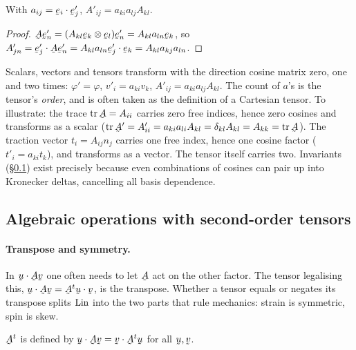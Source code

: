 \begin{theorem}\label{thm:tenstrans}
With $a_{ij}=\ip{\be_{i}}{\be'_{j}}$, $A'_{ij}=a_{ki}a_{lj}A_{kl}$.
\end{theorem}

\begin{proof}
$\bA\be'_{n}=(A_{kl}\be_{k}\otimes\be_{l})\be'_{n}=A_{kl}a_{ln}\be_{k}$,
so $A'_{jn}=\ip{\be'_{j}}{\bA\be'_{n}}=A_{kl}a_{ln}\ip{\be'_{j}}{\be_{k}}
=A_{kl}a_{kj}a_{ln}$.
\end{proof}

\begin{remark}[order $=$ number of cosine factors]\label{rem:order}
Scalars, vectors and tensors transform with the direction cosine matrix
zero, one and two times: $\varphi'=\varphi$, $v'_{i}=a_{ki}v_{k}$,
$A'_{ij}=a_{ki}a_{lj}A_{kl}$. The count of $a$'s is the tensor's
\emph{order}, and is often taken as the definition of a Cartesian tensor.
To illustrate: the trace $\tr\bA=A_{ii}$ carries zero free indices, hence
zero cosines and transforms as a scalar ($\tr\bA'=A'_{ii}=a_{ki}a_{li}A_{kl}
=\dd_{kl}A_{kl}=A_{kk}=\tr\bA$). The traction vector
$t_i=A_{ij}n_j$ carries one free index, hence one cosine factor ($t'_i
=a_{ki}t_k$), and transforms as a vector. The tensor itself carries two.
Invariants (\S\ref{ss:ops}) exist precisely because even combinations of
cosines can pair up into Kronecker deltas, cancelling all basis dependence.
\end{remark}

\subsection{Algebraic operations with second-order tensors}\label{ss:ops}

\paragraph*{Transpose and symmetry.}
In $\ip\bu{\bA\bv}$ one often needs to let $\bA$ act on the other factor.
The tensor legalising this, $\ip\bu{\bA\bv}=\ip{\bA^{t}\bu}\bv$, is the
transpose. Whether a tensor equals or negates its transpose splits $\operatorname{Lin}$
into the two parts that rule mechanics: strain is symmetric, spin is skew.

\begin{definition}[Transpose]\label{def:transpose}
$\bA^{t}$ is defined by $\ip\bu{\bA\bv}=\ip\bv{\bA^{t}\bu}$ for all
$\bu,\bv$.
\end{definition}

